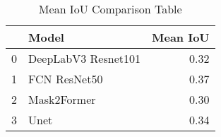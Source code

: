 \begin{table}
\centering
\caption{Mean IoU Comparison Table}
\label{tab:mean_iou_comparison}
\begin{tabular}{llr}
\toprule
{} &                Model &  Mean IoU \\
\midrule
0 &  DeepLabV3 Resnet101 &      0.32 \\
1 &         FCN ResNet50 &      0.37 \\
2 &          Mask2Former &      0.30 \\
3 &                 Unet &      0.34 \\
\bottomrule
\end{tabular}
\end{table}
